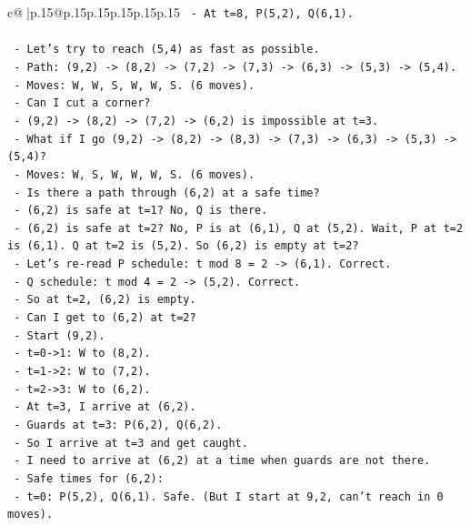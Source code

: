 \documentclass{article}
\begin{document}
{\begin{supertabular}{c@{$\;$}|p{.15\linewidth}@{}p{.15\linewidth}p{.15\linewidth}p{.15\linewidth}p{.15\linewidth}p{.15\linewidth}}
{{{\texttt{  {-} At t=8, P(5,2), Q(6,1).} \\
\\ 
\texttt{  {-} Let's try to reach (5,4) as fast as possible.} \\
\texttt{  {-} Path: (9,2) {-}> (8,2) {-}> (7,2) {-}> (7,3) {-}> (6,3) {-}> (5,3) {-}> (5,4).} \\
\texttt{  {-} Moves: W, W, S, W, W, S. (6 moves).} \\
\texttt{  {-} Can I cut a corner?} \\
\texttt{  {-} (9,2) {-}> (8,2) {-}> (7,2) {-}> (6,2) is impossible at t=3.} \\
\texttt{  {-} What if I go (9,2) {-}> (8,2) {-}> (8,3) {-}> (7,3) {-}> (6,3) {-}> (5,3) {-}> (5,4)?} \\
\texttt{  {-} Moves: W, S, W, W, W, S. (6 moves).} \\
\texttt{  {-} Is there a path through (6,2) at a safe time?} \\
\texttt{  {-} (6,2) is safe at t=1? No, Q is there.} \\
\texttt{  {-} (6,2) is safe at t=2? No, P is at (6,1), Q at (5,2). Wait, P at t=2 is (6,1). Q at t=2 is (5,2). So (6,2) is empty at t=2?} \\
\texttt{    {-} Let's re{-}read P schedule: t mod 8 = 2 {-}> (6,1). Correct.} \\
\texttt{    {-} Q schedule: t mod 4 = 2 {-}> (5,2). Correct.} \\
\texttt{    {-} So at t=2, (6,2) is empty.} \\
\texttt{    {-} Can I get to (6,2) at t=2?} \\
\texttt{    {-} Start (9,2).} \\
\texttt{    {-} t=0{-}>1: W to (8,2).} \\
\texttt{    {-} t=1{-}>2: W to (7,2).} \\
\texttt{    {-} t=2{-}>3: W to (6,2).} \\
\texttt{    {-} At t=3, I arrive at (6,2).} \\
\texttt{    {-} Guards at t=3: P(6,2), Q(6,2).} \\
\texttt{    {-} So I arrive at t=3 and get caught.} \\
\texttt{    {-} I need to arrive at (6,2) at a time when guards are not there.} \\
\texttt{    {-} Safe times for (6,2):} \\
\texttt{      {-} t=0: P(5,2), Q(6,1). Safe. (But I start at 9,2, can't reach in 0 moves).} \\
}}}
\end{supertabular}}
\end{document}
